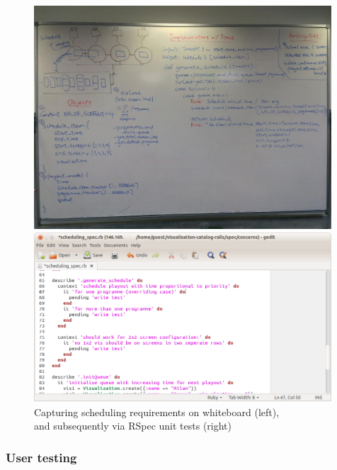 \documentclass[a4paper, titlepage]{article}
\begin{document}
\begin{figure}[ht]
  \begin{minipage}{0.46\textwidth}
      \includegraphics[width = 0.99\textwidth, trim = 0 1cm 0 1.5cm, clip]{./eval/scheduling_whiteboard.jpg}
  \end{minipage}
  \begin{minipage}{0.53\textwidth}
      \includegraphics[width = 0.99\textwidth]{./eval/scheduling_spec.png}
  \end{minipage}
  \caption{Capturing scheduling requirements on whiteboard (left), \\ and subsequently via RSpec unit tests (right)}
  \label{fig:eval_scheduling}
\end{figure}

\subsubsection{User testing}
\end{document}
